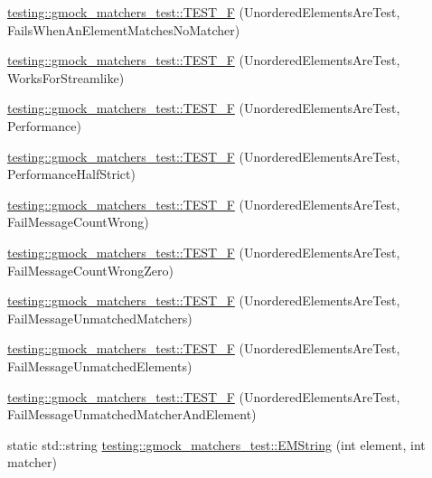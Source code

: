 \begin{DoxyCompactItemize}
\item 
\mbox{\hyperlink{namespacetesting_1_1gmock__matchers__test_a62fd481b1160a667c785e6009ff87163}{testing\+::gmock\+\_\+matchers\+\_\+test\+::\+T\+E\+S\+T\+\_\+F}} (Unordered\+Elements\+Are\+Test, Fails\+When\+An\+Element\+Matches\+No\+Matcher)
\item 
\mbox{\hyperlink{namespacetesting_1_1gmock__matchers__test_a2affca2a152e4537c2f06518eaa2eac5}{testing\+::gmock\+\_\+matchers\+\_\+test\+::\+T\+E\+S\+T\+\_\+F}} (Unordered\+Elements\+Are\+Test, Works\+For\+Streamlike)
\item 
\mbox{\hyperlink{namespacetesting_1_1gmock__matchers__test_a074ca2babea203d1a54d69ff1fde5c59}{testing\+::gmock\+\_\+matchers\+\_\+test\+::\+T\+E\+S\+T\+\_\+F}} (Unordered\+Elements\+Are\+Test, Performance)
\item 
\mbox{\hyperlink{namespacetesting_1_1gmock__matchers__test_a4437de9d40efd87f73b738ef38c2d70f}{testing\+::gmock\+\_\+matchers\+\_\+test\+::\+T\+E\+S\+T\+\_\+F}} (Unordered\+Elements\+Are\+Test, Performance\+Half\+Strict)
\item 
\mbox{\hyperlink{namespacetesting_1_1gmock__matchers__test_a5dd3b28b540c1ef01e623f840c48e7b4}{testing\+::gmock\+\_\+matchers\+\_\+test\+::\+T\+E\+S\+T\+\_\+F}} (Unordered\+Elements\+Are\+Test, Fail\+Message\+Count\+Wrong)
\item 
\mbox{\hyperlink{namespacetesting_1_1gmock__matchers__test_a7dc8c467fe0d6f26c0ee643be56eb590}{testing\+::gmock\+\_\+matchers\+\_\+test\+::\+T\+E\+S\+T\+\_\+F}} (Unordered\+Elements\+Are\+Test, Fail\+Message\+Count\+Wrong\+Zero)
\item 
\mbox{\hyperlink{namespacetesting_1_1gmock__matchers__test_a11b785087491ae58b074fa8dbbc88cd4}{testing\+::gmock\+\_\+matchers\+\_\+test\+::\+T\+E\+S\+T\+\_\+F}} (Unordered\+Elements\+Are\+Test, Fail\+Message\+Unmatched\+Matchers)
\item 
\mbox{\hyperlink{namespacetesting_1_1gmock__matchers__test_a6dfb50dcbb543de71fcc4d09844d36b3}{testing\+::gmock\+\_\+matchers\+\_\+test\+::\+T\+E\+S\+T\+\_\+F}} (Unordered\+Elements\+Are\+Test, Fail\+Message\+Unmatched\+Elements)
\item 
\mbox{\hyperlink{namespacetesting_1_1gmock__matchers__test_a2395b7e71b7ad50af72caa61c10e6898}{testing\+::gmock\+\_\+matchers\+\_\+test\+::\+T\+E\+S\+T\+\_\+F}} (Unordered\+Elements\+Are\+Test, Fail\+Message\+Unmatched\+Matcher\+And\+Element)
\item 
static std\+::string \mbox{\hyperlink{namespacetesting_1_1gmock__matchers__test_a9e6816bb66047e834f73ce571f2598d1}{testing\+::gmock\+\_\+matchers\+\_\+test\+::\+E\+M\+String}} (int element, int matcher)

\end{DoxyCompactItemize}
